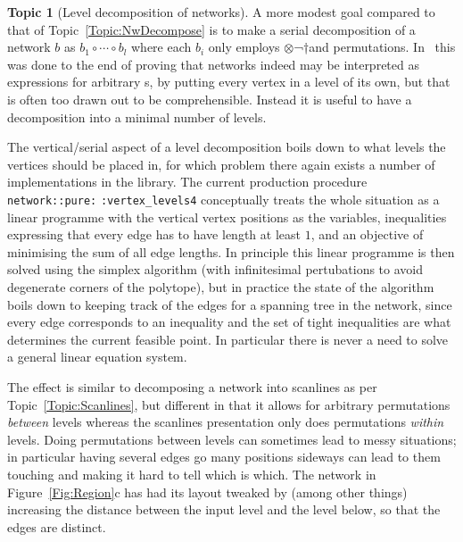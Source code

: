 \documentclass{article}
\theoremstyle{definition}
\newtheorem{topic}{Topic}
\newcommand{\PROP}{\smaller{PROP}}
\newcommand{\PROPs}{\PROP s}
\begin{document}
\begin{topic}[Level decomposition of networks] 
  \label{Topic:LevelDecompose}
  A more modest goal compared to that of 
  Topic~\ref{Topic:NwDecompose} is to make a serial decomposition of 
  a network $b$ as \(b_1 \circ \dotsb \circ b_l\) where each $b_i$ 
  only employs $\otimes$¬†and permutations. In~\cite[Sec.~4--5]{NR1} 
  this was done to the end of proving that networks indeed may be 
  interpreted as expressions for arbitrary \PROPs, by putting every 
  vertex in a level of its own, but that is often too drawn out 
  to be comprehensible. Instead it is useful to have a decomposition 
  into a minimal number of levels.
  
  The vertical\slash serial aspect of a level decomposition boils down 
  to what levels the vertices should be placed in, for which problem 
  there again exists a number of implementations in the library. The 
  current production procedure 
  \texttt{network:\discretionary{}{}{}:pure:}\discretionary{}{}{}%
  \verb|:vertex_levels4| conceptually treats the whole situation as a 
  linear programme with the vertical vertex positions as the 
  variables, inequalities expressing that every edge has to have 
  length at least $1$, and an objective of minimising the sum of all 
  edge lengths. In principle this linear programme is then solved 
  using the simplex algorithm (with infinitesimal pertubations to 
  avoid degenerate corners of the polytope), but in practice the 
  state of the algorithm boils down to keeping track of the edges for 
  a spanning tree in the network, since every edge corresponds to an 
  inequality and the set of tight inequalities are what determines 
  the current feasible point. In particular there is never a need to 
  solve a general linear equation system.
\end{topic}

The effect is similar to decomposing a network into scanlines as per 
Topic~\ref{Topic:Scanlines}, but different in that it allows for 
arbitrary permutations \emph{between} levels whereas the scanlines 
presentation only does permutations \emph{within} levels. Doing 
permutations between levels can sometimes lead to messy situations; 
in particular having several edges go many positions sideways can 
lead to them touching and making it hard to tell which is which. 
The network in Figure~\ref{Fig:Region}c has had its layout tweaked by 
(among other things) increasing the distance between the input level 
and the level below, so that the edges are distinct.
\end{document}
